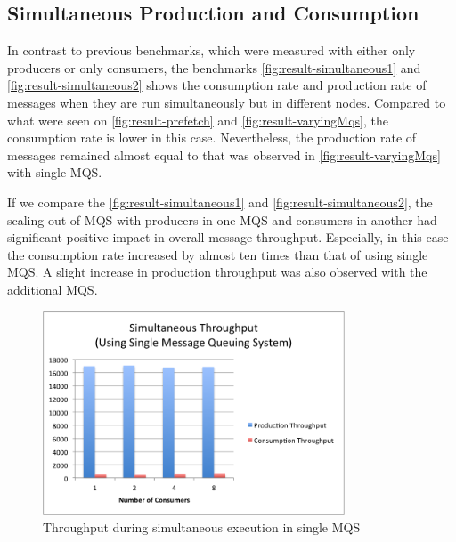 \subsection{Simultaneous Production and Consumption}
\label{subsec:simultaneous}
  In contrast to previous benchmarks, which were measured with either only producers or only consumers, the benchmarks \autoref{fig:result-simultaneous1} and \autoref{fig:result-simultaneous2} shows the consumption rate and production rate of messages when they are run simultaneously but in different nodes. Compared to what were seen on \autoref{fig:result-prefetch} and
  \autoref{fig:result-varyingMqs}, the consumption rate is lower in this case. Nevertheless, the production rate of messages remained almost equal to that was observed in \autoref{fig:result-varyingMqs} with single MQS.

  If we compare the \autoref{fig:result-simultaneous1} and \autoref{fig:result-simultaneous2}, the scaling out of MQS with producers in one MQS and consumers in another had significant positive impact in overall message throughput. Especially, in this case the consumption rate increased by almost ten times than that of using single MQS. A slight increase in production throughput was also observed with the additional MQS.

\begin{figure}[H]
  \centering
  \includegraphics[width=0.8\textwidth]{figures/07simultaneous1}
  \caption[Throughput during simultaneous execution in single MQS]{Throughput during simultaneous execution in single MQS}
  \label{fig:result-simultaneous1}
\end{figure}


